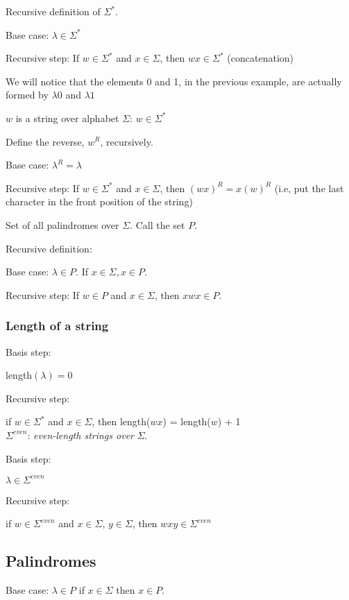 \documentclass[english,openany]{book}
\begin{document}
    Recursive definition of $\Sigma^*$.

    Base case: $\lambda \in \Sigma^*$

    Recursive step: If $w \in \Sigma^*$ and $x \in \Sigma$, then $wx \in \Sigma^*$ (concatenation)

    We will notice that the elements 0 and 1, in the previous example, are actually formed by $\lambda0$ and $\lambda1$

    $w$ is a string over alphabet $\Sigma$: $w \in \Sigma^*$

    Define the reverse, $w^R$, recursively.

    Base case: $\lambda^R = \lambda$

    Recursive step: If $w \in \Sigma^*$ and $x \in \Sigma$, then $(wx)^R = x(w)^R$ (i.e, put the last character in the front position of the string)

    Set of all palindromes over $\Sigma$. Call the set $P$.

    Recursive definition:

    Base case: $\lambda \in P$. If $x \in \Sigma, x \in P$.

    Recursive step: If $w \in P$ and $x \in \Sigma$, then $xwx \in P$.

    \subsubsection{Length of a string}

    Basis step:

    length$(\lambda) = 0$

    Recursive step:

    if $w \in \Sigma^*$ and $x \in \Sigma$, then length($wx$) = length($w$) + 1\\


    $\Sigma^{even}$: \textit{even-length strings over} $\Sigma$.

    Basis step:

    $\lambda \in \Sigma^{even}$

    Recursive step:

    if $w \in \Sigma^{even}$ and $x \in \Sigma$, $y \in \Sigma$, then $wxy \in \Sigma^{even}$

    \subsection{Palindromes}

    Base case: $\lambda \in P$ if $x \in \Sigma$ then $x \in P$.
\end{document}

